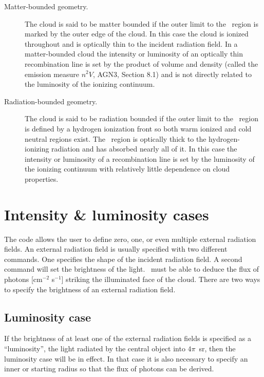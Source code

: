\begin{description}
\item[Matter-bounded geometry.]
The cloud is said to be matter bounded if
the outer limit to the \hplus\ region is marked by the
outer edge of the cloud.
In this case the cloud is ionized throughout
and is optically thin to the
incident radiation field.
In a matter-bounded cloud the intensity or luminosity
of an optically thin recombination line is set by
the product of volume and density
(called the emission measure $n^2V$, AGN3, Section 8.1) and is
not directly related to the luminosity of the ionizing continuum.

\item[Radiation-bounded geometry.]
The cloud is said to be radiation bounded
if the outer limit to the \hplus\ region is defined by
a hydrogen ionization
front so both warm ionized and cold neutral regions exist.
The \hplus\ region
is optically thick to the hydrogen-ionizing radiation
and has absorbed nearly all of it.
In this case the intensity or luminosity of a recombination
line is set by the luminosity of the ionizing continuum with
relatively little dependence on cloud properties.
\end{description}

\section{Intensity \& luminosity cases }
\label{sec:IntensityLuminosityCases}

The code allows the user to define zero, one, or even multiple external radiation fields.
An external radiation field is usually specified with
two different commands.
One specifies the shape of the incident radiation field.
A second command will set the brightness of the light.
\Cloudy\ must be able to deduce the flux of photons
[cm$^{-2}$ s$^{-1}$]
striking the illuminated face of the cloud.
There are two ways to specify the brightness of an external radiation field.

\subsection{Luminosity case}

If the brightness of at least one of the external radiation fields is specified as a ``luminosity'',
the light radiated by the central object into $4\pi$~sr, then the luminosity case will be in effect.
In that case it is also
necessary to specify an inner or starting radius so that the flux of
photons can be derived.


